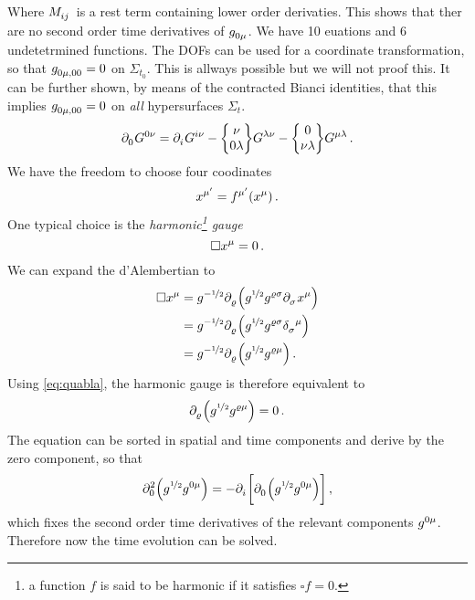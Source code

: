 Where $\tensor{M}{_i_j}$ is a rest term containing lower order derivaties.
This shows that ther are no second order time derivatives of
$\tensor{g}{_0_\mu}$. We have 10 euations and 6 undetetrmined functions. The
DOFs can be used for a coordinate transformation, so that
$\tensor{g}{_0_\mu_{,00}}=0$ on $\Sigma_{t_0}$. This is allways possible but we
will not proof this. It can be further shown, by means of the contracted Bianci
identities, that this implies $\tensor{g}{_0_\mu_{,00}}=0$ on \emph{all}
hypersurfaces $\Sigma_{t}$.
\begin{equation}
\tensor{\partial}{_0}\tensor{G}{^0^\nu}=
\tensor{\partial}{_i}\tensor{G}{^i^\nu}
-\cSym{\nu}{0}{\lambda}\tensor{G}{^\lambda^\nu}
-\cSym{0}{\nu}{\lambda}\tensor{G}{^\mu^\lambda}\,.
\end{equation}
We have the freedom to choose four coodinates
\begin{equation}
\tensor{x}{^{\mu^\prime}}=\tensor{f}{^{\mu^\prime}}\left(\tensor{x}{^\mu}\right)\,.
\end{equation}
One typical choice is the \emph{harmonic\footnote{a function $f$ is said to be
harmonic if it satisfies $\square f = 0$.} gauge}
\begin{equation}
\square\tensor{x}{^\mu}=0\,.
\end{equation}
We can expand the d'Alembertian to
\begin{equation}
\begin{split}
\square\tensor{x}{^\mu}&=g^{-\nicefrac{1}{2}}\tensor{\partial}{_\varrho}\left(g^{\nicefrac{1}{2}}\tensor{g}{^\varrho^\sigma}\tensor{\partial}{_\sigma}\tensor{x}{^\mu}\right)\\
&=g^{-\nicefrac{1}{2}}\tensor{\partial}{_\varrho}\left(g^{\nicefrac{1}{2}}\tensor{g}{^\varrho^\sigma}\tensor{\delta}{_\sigma^\mu}\right)\\
&=g^{-\nicefrac{1}{2}}\tensor{\partial}{_\varrho}\left(g^{\nicefrac{1}{2}}\tensor{g}{^\varrho^\mu}\right)\,.\\
\end{split}
\end{equation}
Using \eqref{eq:quabla}, the harmonic gauge is therefore equivalent to
\begin{equation}
\tensor{\partial}{_\varrho}\left(g^{\nicefrac{1}{2}}\tensor{g}{^\varrho^\mu}\right)=0\,
.\\
\end{equation}
The equation can be sorted in spatial and time components and derive by the
zero component, so that
\begin{equation}
\tensor*{\partial}{*_0^2}\left(g^{\nicefrac{1}{2}}\tensor{g}{^0^\mu}\right)
=
-\tensor{\partial}{_i}\left[\tensor{\partial}{_0}\left(g^{\nicefrac{1}{2}}\tensor{g}{^0^\mu}\right)\right]\,
,\end{equation}
which fixes the second order time derivatives of the relevant components
$\tensor{g}{^0^\mu}$. Therefore now the time evolution can be solved. 
